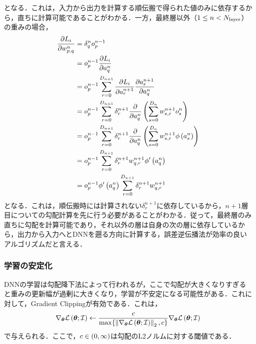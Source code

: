 となる．これは，入力から出力を計算する順伝搬で得られた値のみに依存するから，直ちに計算可能であることがわかる．一方，最終層以外（$1 \le n < N_{\text{layer}}$）の重みの場合，
\begin{align}
    \pdv{L_{i}}{w_{p, q}^{n}} & = \delta_{q}^{n} o_{p}^{n - 1}                                                                                                            \\
                                        & = o_{p}^{n - 1} \pdv{L_{i}}{a_{q}^{n}}                                                                                                    \\
                                        & = o_{p}^{n - 1} \sum_{r = 0}^{D_{n + 1}} \pdv{L_{i}}{a_{r}^{n + 1}} \pdv{a_{r}^{n + 1}}{a_{q}^{n}}                              \\
                                        & = o_{p}^{n - 1} \sum_{r = 0}^{D_{n + 1}} \delta_{r}^{n + 1} \pdv{a_{q}^{n}} \left(\sum_{s = 0}^{D_{n}} w_{s, r}^{n + 1} o_{s}^{n}\right)          \\
                                        & = o_{p}^{n - 1} \sum_{r = 0}^{D_{n + 1}} \delta_{r}^{n + 1} \pdv{a_{q}^{n}} \left(\sum_{s = 0}^{D_{n}} w_{s, r}^{n + 1} \phi\left(a_{s}^{n}\right)\right) \\
                                        & = o_{p}^{n - 1} \sum_{r = 0}^{D_{n + 1}} \delta_{r}^{n + 1} w_{q, r}^{n + 1} \phi'\left(a_{q}^{n}\right)                                          \\
                                        & = o_{p}^{n - 1} \phi'\left(a_{q}^{n}\right) \sum_{r = 0}^{D_{n + 1}} \delta_{r}^{n + 1} w_{q, r}^{n + 1}
\end{align}
となる．これは，順伝搬時には計算されない$\delta_{r}^{n + 1}$に依存しているから，$n + 1$層目についての勾配計算を先に行う必要があることがわかる．従って，最終層のみ直ちに勾配を計算可能であり，それ以外の層は自身の次の層に依存しているから，出力から入力へとDNNを遡る方向に計算する，誤差逆伝播法が効率の良いアルゴリズムだと言える．

\subsubsection{学習の安定化}
DNNの学習は勾配降下法によって行われるが，ここで勾配が大きくなりすぎると重みの更新幅が過剰に大きくなり，学習が不安定になる可能性がある．これに対して，Gradient Clippingが有効である．これは，
\begin{equation}
    \nabla_{\bm{\theta}} \mathcal{L}\left(\bm{\theta}; \mathcal{I}\right) \gets \frac{c}{\max \{\left\|\nabla_{\bm{\theta}} \mathcal{L}\left(\bm{\theta}; \mathcal{I}\right)\right\|_{2}, c\}} \nabla_{\bm{\theta}} \mathcal{L}\left(\bm{\theta}; \mathcal{I}\right)
\end{equation}
で与えられる．ここで，$c \in \left(0, \infty\right)$は勾配のL2ノルムに対する閾値である．


